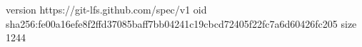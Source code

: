 version https://git-lfs.github.com/spec/v1
oid sha256:fe00a16efe8f2ffd37085baff7bb04241c19cbcd72405f22fc7a6d60426fc205
size 1244
